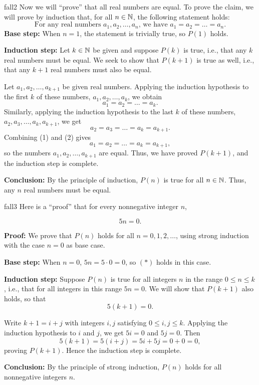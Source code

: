 \begin{example}{fall2}
Now we will ``prove'' that all real numbers are equal. To prove the claim, we will prove by induction that, for all $n\in\mathbb{N}$,
the following statement holds:
\[
\text{For any real numbers $a_1,a_2,\dots, a_n$, we have $a_1=a_2=\dots=a_n$.}
\tag{$P(n)$}
\]
\textbf{Base step:} When $n=1$, the statement is trivially true, so $P(1)$
holds.  

\textbf{Induction step:} 
Let $k\in\mathbb{N}$ be given and suppose 
$P(k)$ is true, i.e., that any $k$ real numbers must be equal.
We seek to show that $P(k+1)$  is true as well,
i.e., that any $k+1$ real numbers must also be equal.

Let $a_1,a_2,\dots,a_{k+1}$ be given real numbers.  Applying the induction
hypothesis to the first $k$ of these numbers, $a_1,a_2,\dots,a_k$, we obtain
\[
\tag{1}
a_1=a_2=\dots=a_k.
\]
Similarly, applying the induction hypothesis to the last $k$ of these numbers, 
$a_2,a_3,\dots,a_k,a_{k+1}$, we get
\[
\tag{2}
a_2=a_3=\dots=a_k=a_{k+1}.
\]
Combining (1) and (2) gives
\[
\tag{3}
a_1=a_2=\dots=a_k=a_{k+1},
\]
so the numbers $a_1,a_2,\dots,a_{k+1}$ are equal.
Thus, we have proved $P(k+1)$, and the induction step is complete. 

\textbf{Conclusion:} By the principle of induction, 
$P(n)$  is true for all $n\in\mathbb{N}$. Thus, any $n$ real numbers must be equal.
\end{example}

%


\begin{example}{fall3} 
Here is a ``proof'' that for every nonnegative integer $n$, 

\[ \tag{$P(n)$} 5n=0.  \]

\textbf{Proof:} We prove that $P(n)$ holds for all $n=0,1,2,\dots$, using
strong induction with the case $n=0$ as base case.

\textbf{Base step:} When $n=0$, $5n=5\cdot0=0$, so $(*)$ holds in this case.

\textbf{Induction step:} 
Suppose $P(n)$ is true for all integers $n$ in the range $0\le n\le k$, i.e.,
that for all integers in this range $5n=0$.  We will show that $P(k+1)$ also holds, so that
\[ \tag{$P(k+1)$} 5(k+1)=0.  \]

Write $k+1=i+j$ with integers $i,j$ satisfying $0\le i,j\le k$. 
Applying the induction hypothesis to $i$ and $j$, we get $5i=0$ and $5j=0$.
Then
\[
5(k+1)=5(i+j)=5i+5j=0+0=0,
\]
proving $P(k+1)$.  Hence the induction step is complete.

\textbf{Conclusion:} By the principle of strong induction, $P(n)$ holds for all
nonnegative integers $n$.
\end{example}


